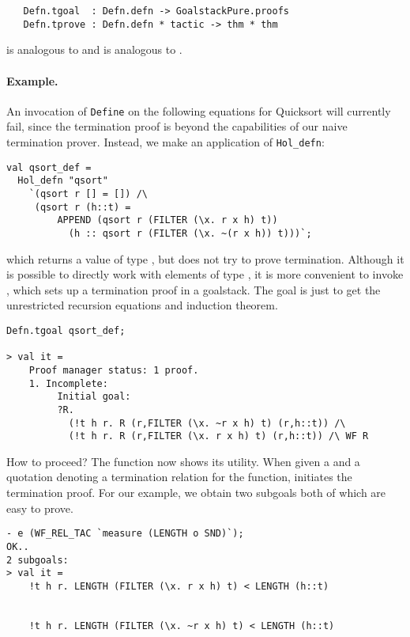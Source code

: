 \begin{verbatim}
   Defn.tgoal  : Defn.defn -> GoalstackPure.proofs
   Defn.tprove : Defn.defn * tactic -> thm * thm
\end{verbatim}
 is analogous to  and  is
analogous to .

\paragraph{Example.} An invocation of {\small\verb+Define+} on
the following equations for Quicksort will currently fail, since the
termination proof is beyond the capabilities of our naive termination
prover. Instead, we make an application of {\small\verb+Hol_defn+}:

\setcounter{sessioncount}{0}
\begin{session}
\begin{verbatim}
val qsort_def =
  Hol_defn "qsort"
    `(qsort r [] = []) /\
     (qsort r (h::t) =
         APPEND (qsort r (FILTER (\x. r x h) t))
           (h :: qsort r (FILTER (\x. ~(r x h)) t)))`;
\end{verbatim}
\end{session}
which returns a value of type , but does not try to prove
termination. Although it is possible to directly work with elements of
type \ml{defn}, it is more convenient to invoke , which sets up a termination proof in a goalstack. The
goal is just to get the unrestricted recursion equations and induction
theorem.

\begin{session}
\begin{verbatim}
Defn.tgoal qsort_def;

> val it =
    Proof manager status: 1 proof.
    1. Incomplete:
         Initial goal:
         ?R.
           (!t h r. R (r,FILTER (\x. ~r x h) t) (r,h::t)) /\
           (!t h r. R (r,FILTER (\x. r x h) t) (r,h::t)) /\ WF R
\end{verbatim}
\end{session}

How to proceed? The function  now shows its utility.
When given a  and a quotation denoting a termination relation
for the function, \ml{WF\_REL\_TAC} initiates the termination proof.
For our example, we obtain two subgoals both of which are easy to
prove.

\begin{session}
\begin{verbatim}
- e (WF_REL_TAC `measure (LENGTH o SND)`);
OK..
2 subgoals:
> val it =
    !t h r. LENGTH (FILTER (\x. r x h) t) < LENGTH (h::t)


    !t h r. LENGTH (FILTER (\x. ~r x h) t) < LENGTH (h::t)
\end{verbatim}
\end{session}


